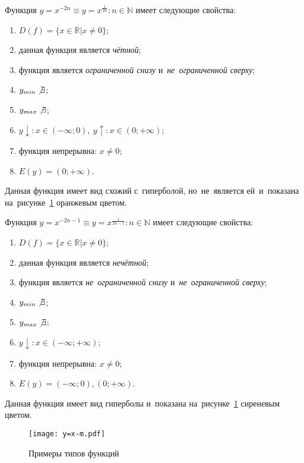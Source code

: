 \documentclass[]{scrartcl}
\begin{document}
Функция ${\textstyle y=x^{-2n} \equiv y=x^{\frac{1}{2n}} : n \in \mathbb{N}}$ имеет следующие свойства:
\begin{enumerate}
	\item ${\textstyle D(f)=\{x \in \mathbb{R} | x \neq 0\}}$;
	\item данная функция является \emph{чётной};
	\item функция является \emph{ограниченной снизу} и~\emph{не~ограниченной сверху};
	\item ${\textstyle y_{min}\not \exists}$;
	\item ${\textstyle y_{max}\not \exists}$;
	\item ${\textstyle y\downarrow:x\in (-\infty;0),\ y\uparrow:x\in (0;+\infty)}$;
	\item функция непрерывна: ${\textstyle x \neq 0}$;
	\item ${\textstyle E(y)=(0;+\infty)}$.
\end{enumerate}
Данная функция имеет вид схожий с~гиперболой, но~не~является ей~и~показана на~рисунке~\ref{fig:y=x^m} оранжевым цветом.

Функция ${\textstyle y=x^{-2n-1} \equiv y=x^{\frac{1}{2n-1}} : n \in \mathbb{N}}$ имеет следующие свойства:
\begin{enumerate}
	\item ${\textstyle D(f)=\{x \in \mathbb{R} | x \neq 0\}}$;
	\item данная функция является \emph{нечётной};
	\item функция является \emph{не~ограниченной снизу} и~\emph{не~ограниченной сверху};
	\item ${\textstyle y_{min}\not \exists}$;
	\item ${\textstyle y_{max}\not \exists}$;
	\item ${\textstyle y\downarrow:x\in (-\infty;+\infty)}$;
	\item функция непрерывна: ${\textstyle x \neq 0}$;
	\item ${\textstyle E(y)=(-\infty;0),(0;+\infty)}$.
\end{enumerate}
Данная функция имеет вид гиперболы и~показана на~рисунке~\ref{fig:y=x^m} сиреневым цветом.

\begin{figure}[ht]
	\centering %
	\texttt{[image: y=x-m.pdf]}
	\caption{Примеры типов функций}\label{fig:y=x^m}
\end{figure}
\end{document}
